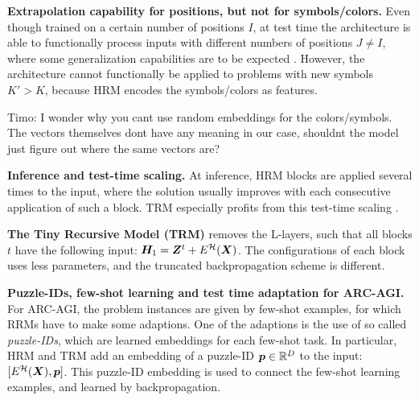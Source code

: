 \documentclass{article}
\theoremstyle{plain}
\theoremstyle{definition}
\theoremstyle{remark}
\newcommand{\TB}[1]{\textcolor{jku_cyan}{Timo: #1}}
\renewcommand{\paragraph}[1]{\textbf{#1}\;}
\begin{document}
\paragraph{Extrapolation capability for positions, but
not for symbols/colors.}
Even though trained on a certain number of positions
$I$, at test time the architecture is able to functionally process
inputs with different numbers of positions $J \neq I$, 
where some generalization capabilities are
to be expected \citep{kazemnejad2023impact,anil2022exploring}.
However, the architecture
cannot functionally be applied to problems with 
new symbols $K'>K$, because HRM encodes the symbols/colors
as features.

\TB{I wonder why you cant use random embeddings for the colors/symbols. The vectors themselves dont have any meaning in our case, shouldnt the model just figure out where the same vectors are?}


\paragraph{Inference and test-time scaling.}
At inference, HRM blocks are applied several 
times to the input, where the solution 
usually improves with each consecutive 
application of such a block. TRM especially
profits from 
this test-time scaling \citep{roye2025tiny}.


\paragraph{The Tiny Recursive Model (TRM)}
removes the L-layers, such that 
all blocks $t$ have the following 
input: $\bm{H}_1 = \bm{Z}^t + E^{\mathcal H}(\bm{X})$.
The configurations of each block uses 
less parameters, and the truncated
backpropagation scheme is different. 

\paragraph{Puzzle-IDs, few-shot learning
and test time adaptation for ARC-AGI.}
For ARC-AGI, the problem instances are given 
by few-shot examples, for which RRMs have to 
make some adaptions. One of the adaptions is
the use of so called \emph{puzzle-IDs}, which 
are learned embeddings for each few-shot task. 
In particular, HRM and TRM add an embedding of a
puzzle-ID $\bm{p} \in \mathbb{R}^D$
to the input: $[E^{\mathcal H}(\bm{X}) ,\bm{p} ]$. 
This puzzle-ID embedding is used to 
connect the few-shot learning examples, 
and learned by backpropagation. 
\end{document}
